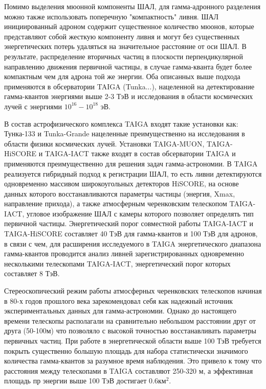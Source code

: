 Помимо выделения мюонной компоненты ШАЛ, для гамма-адронного разделения можно также использовать поперечную "компактность" ливня. ШАЛ инициированный адроном содержит существенное количество мюонов, которые представляют собой жесткую компоненту ливня и могут без существенных энергетических потерь удаляться на значительное расстояние от оси ШАЛ. В результате, распределение вторичных частиц в плоскости перпендикулярной направлению движения первичной частицы, в случае гамма-кванта будет более компактным чем для адрона той же энергии. Оба описанных выше подхода применяются в обсерватории TAIGA (Tunka...), нацеленной на детектирование гамма-квантов энергиями выше 2-3 ТэВ и исследования в области космических лучей с энергиями $10^{16} - 10^{18}$ эВ.

В состав астрофизического комплекса TAIGA входят такие установки как: Тунка-133 и Tunka-Grande нацеленные преимущественно на исследования в области физики космических лучей. Установки TAIGA-MUON, TAIGA-HiSCORE и TAIGA-IACT также входят в состав обсерватории TAIGA и применяются преимущественно для решения задач гамма-астрономии. В TAIGA реализуется гибридный подход к регистрации ШАЛ, то есть ливни детектируются одновременно массивом широкоугольных детекторов HiSCORE, на основе данных которого восстанавливаются параметры частицы (энергия, Xmax, направление прихода), а также атмосферным черенковским телескопом TAIGA-IACT, угловое изображение ШАЛ с камеры которого позволяет определять тип первичной частицы. Энергетический порог совместной работы TAIGA-IACT и TAIGA-HiSCORE составляет 40 ТэВ для гамма-квантов и 100 ТэВ для адронов, в связи с чем, для расширения исследуемого в TAIGA энергетического диапазона гамма-квантов проводится анализ ливней зарегистрированных одновременно несколькими телескопами TAIGA-IACT, энергетический порог которых составляет 8 ТэВ.

Стереоскопический режим работы атмосферных черенковских телескопов начиная в 80-х годов прошлого века зарекомендовал себя как надежный источник экспериментальных данных для гамма-астрономии. Однако до настоящего времени телескопы располагали на сравнительно небольшом расстоянии друг от друга (50-100м) что позволяло с высокой точностью восстанавливать параметры первичных частиц. При работе в энергетической области выше 100 ТэВ требуется покрыть существенно большую площадь для набора статистически значимого количества гамма-квантов за разумное время наблюдения. Это привело к тому что расстояния между телескопами в TAIGA составляют 250-320 м, а эффективная площадь пр энергии выше 100 ТэВ достигает $0.6\text{км}^2$.

